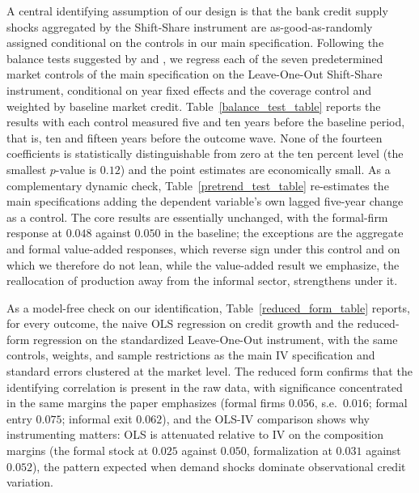 \documentclass[12pt]{article}
\begin{document}
A central identifying assumption of our design is that the bank credit supply shocks aggregated by the Shift-Share instrument are as-good-as-randomly assigned conditional on the controls in our main specification. Following the balance tests suggested by \citet{borusyak2022quasi} and \citet{goldsmith2020bartik}, we regress each of the seven predetermined market controls of the main specification on the Leave-One-Out Shift-Share instrument, conditional on year fixed effects and the coverage control and weighted by baseline market credit. Table~\ref{balance_test_table} reports the results with each control measured five and ten years before the baseline period, that is, ten and fifteen years before the outcome wave. None of the fourteen coefficients is statistically distinguishable from zero at the ten percent level (the smallest $p$-value is $0.12$) and the point estimates are economically small. As a complementary dynamic check, Table~\ref{pretrend_test_table} re-estimates the main specifications adding the dependent variable's own lagged five-year change as a control. The core results are essentially unchanged, with the formal-firm response at $0.048$ against $0.050$ in the baseline; the exceptions are the aggregate and formal value-added responses, which reverse sign under this control and on which we therefore do not lean, while the value-added result we emphasize, the reallocation of production away from the informal sector, strengthens under it.

As a model-free check on our identification, Table~\ref{reduced_form_table} reports, for every outcome, the naive OLS regression on credit growth and the reduced-form regression on the standardized Leave-One-Out instrument, with the same controls, weights, and sample restrictions as the main IV specification and standard errors clustered at the market level. The reduced form confirms that the identifying correlation is present in the raw data, with significance concentrated in the same margins the paper emphasizes (formal firms $0.056$, s.e.\ $0.016$; formal entry $0.075$; informal exit $0.062$), and the OLS-IV comparison shows why instrumenting matters: OLS is attenuated relative to IV on the composition margins (the formal stock at $0.025$ against $0.050$, formalization at $0.031$ against $0.052$), the pattern expected when demand shocks dominate observational credit variation.
\end{document}
